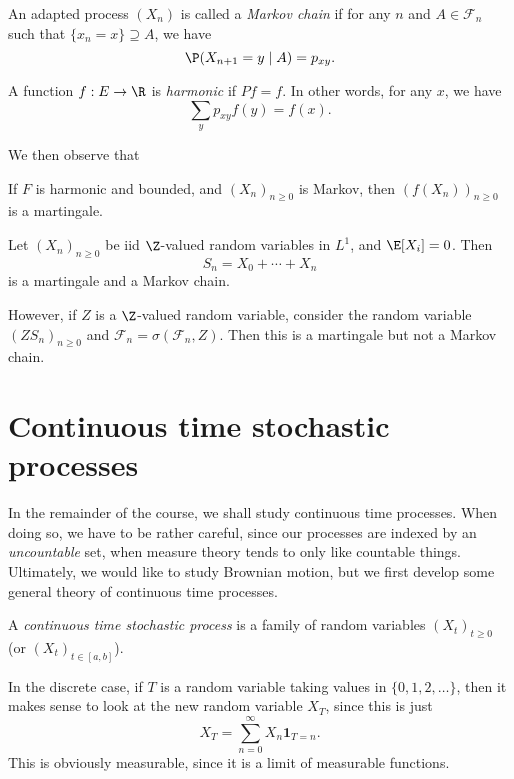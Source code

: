 \documentclass[a4paper]{article}
\begin{document}
\begin{defi}
  An adapted process $(X_n)$ is called a \emph{Markov chain} if for any $n$ and $A \in \mathcal{F}_n$ such that $\{x_n = x\} \supseteq A$, we have
  \[
    \P(X_{n + 1} = y\mid A) = p_{xy}.
  \]
\end{defi}

\begin{defi}
  A function $f: E \to \R$ is \emph{harmonic} if $Pf = f$. In other words, for any $x$, we have
  \[
    \sum_{y} p_{xy} f(y) = f(x).
  \]
\end{defi}
We then observe that

\begin{prop}
  If $F$ is harmonic and bounded, and $(X_n)_{n \geq 0}$ is Markov, then $(f(X_n))_{n \geq 0}$ is a martingale.
\end{prop}

\begin{eg}
  Let $(X_n)_{n \geq 0}$ be iid $\Z$-valued random variables in $L^1$, and $\E[X_i] = 0$. Then
  \[
    S_n = X_0 + \cdots + X_n
  \]
  is a martingale and a Markov chain.

  However, if $Z$ is a $\Z$-valued random variable, consider the random variable $(ZS_n)_{n \geq 0}$ and $\mathcal{F}_n = \sigma(\mathcal{F}_n, Z)$. Then this is a martingale but not a Markov chain.
\end{eg}

\section{Continuous time stochastic processes}
In the remainder of the course, we shall study continuous time processes. When doing so, we have to be rather careful, since our processes are indexed by an \emph{uncountable} set, when measure theory tends to only like countable things. Ultimately, we would like to study Brownian motion, but we first develop some general theory of continuous time processes.

\begin{defi}
  A \emph{continuous time stochastic process} is a family of random variables $(X_t)_{t \geq 0}$ (or $(X_t)_{t \in [a, b]}$).
\end{defi}

In the discrete case, if $T$ is a random variable taking values in $\{0, 1, 2, \ldots\}$, then it makes sense to look at the new random variable $X_T$, since this is just
\[
  X_T = \sum_{n = 0}^\infty X_n \mathbf{1}_{T = n}.
\]
This is obviously measurable, since it is a limit of measurable functions.
\end{document}
